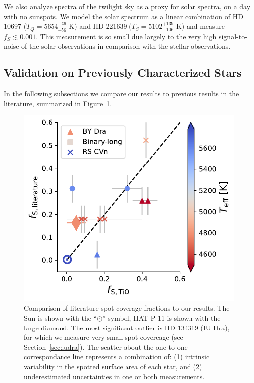 We also analyze spectra of the twilight sky as a proxy for solar spectra, on a day with no sunspots. We model the solar spectrum as a linear combination of HD 10697 ($T_Q = 5654^{+36}_{-56}$ K) and HD 221639 ($T_S = 5102^{+139}_{-106}$ K) and measure $f_S \lesssim 0.001$. This measurement is so small due largely to the very high signal-to-noise of the solar observations in comparison with the stellar observations.


\subsection{Validation on Previously Characterized Stars}

In the following subsections we compare our results to previous results in the literature, summarized in Figure~\ref{fig:fscomp}.

\begin{figure}
    \centering
    \includegraphics[scale=0.8]{freckles/one_to_one.pdf}
    \caption{Comparison of literature spot coverage fractions to our results. The Sun is shown with the ``$\odot$'' symbol, HAT-P-11 is shown with the large diamond. The most significant outlier is HD 134319 (IU Dra), for which we measure very small spot covereage (see Section~\ref{sec:iudra}). The scatter about the one-to-one correspondance line represents a combination of: (1) intrinsic variability in the spotted surface area of each star, and (2) underestimated uncertainties in one or both measurements.}
    \label{fig:fscomp}
\end{figure}

